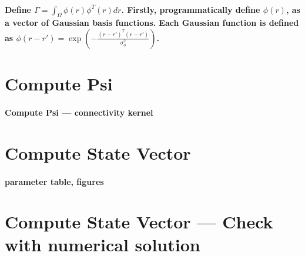 \documentclass[a4paper, 8pt, english]{article}
\begin{document}
\paragraph{Define $\Gamma=\int_{\Omega}\phi(r)\phi^{T}(r)dr$. Firstly, programmatically
define $\phi(r)$, as a vector of Gaussian basis functions. Each Gaussian
function is defined as $\phi(r-r')=\exp{(-\frac{(r-r')^{T}(r-r')}{\sigma_{\phi}^{2}})}$.}

\section{Compute Psi}
\label{compute psi}
\paragraph{Compute Psi --- connectivity kernel}
\label{par:Compute}

\section{Compute State Vector}
\label{state vector}
\paragraph{parameter table, figures}


\section{Compute State Vector --- Check with numerical solution}
\label{sec:Compute State Vector --- Check}
\end{document}
